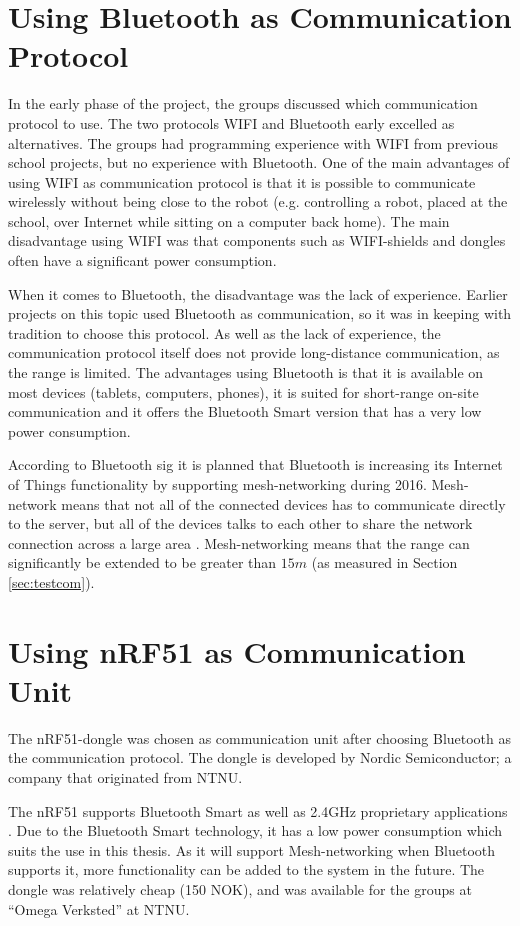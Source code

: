 \section{Using Bluetooth as Communication Protocol}
In the early phase of the project, the groups discussed which communication protocol to use. The two protocols WIFI and Bluetooth early excelled as alternatives. The groups had programming experience with WIFI from previous school projects, but no experience with Bluetooth. One of the main advantages of using WIFI as communication protocol is that it is possible to communicate wirelessly without being close to the robot (e.g. controlling a robot, placed at the school, over Internet while sitting on a computer back home). The main disadvantage using WIFI was that components such as WIFI-shields and dongles often have a significant power consumption.

When it comes to Bluetooth, the disadvantage was the lack of experience. Earlier projects on this topic used Bluetooth as communication, so it was in keeping with tradition to choose this protocol. As well as the lack of experience, the communication protocol itself does not provide long-distance communication, as the range is limited.  The advantages using Bluetooth is that it is available on most devices (tablets, computers, phones), it is suited for short-range on-site communication and it offers the Bluetooth Smart version that has a very low power consumption.

According to Bluetooth \acrshort{sig} \cite{mesh} it is planned that Bluetooth is increasing its Internet of Things functionality by supporting mesh-networking during 2016. Mesh-network means that not all of the connected devices has to communicate directly to the server, but all of the devices talks to each other to share the network connection across a large area \cite{howmesh}. Mesh-networking means that the range can significantly be extended to be greater than $15m$ (as measured in Section \ref{sec:testcom}).

\section{Using nRF51 as Communication Unit}
\label{sec:nrf51asCom}
The nRF51-dongle was chosen as communication unit after choosing Bluetooth as the communication protocol. The dongle is developed by Nordic Semiconductor; a company that originated from NTNU.

The nRF51 supports Bluetooth Smart as well as 2.4GHz proprietary applications \cite{nrf51Dongle}. Due to the Bluetooth Smart technology, it has a low power consumption which suits the use in this thesis. As it will support Mesh-networking when Bluetooth supports it, more functionality can be added to the system in the future. The dongle was relatively cheap (150 NOK), and was available for the groups at ``Omega Verksted'' at NTNU.


